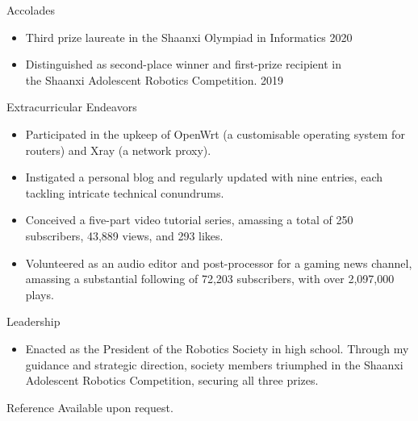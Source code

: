 \documentclass{resume} %
\begin{document}
\begin{rSection}{Accolades} 
\begin{itemize}
    \item Third prize laureate in the Shaanxi Olympiad in Informatics \hfill 2020
    \item Distinguished as second-place winner and first-prize recipient in \\
    the Shaanxi Adolescent Robotics Competition. \hfill 2019
\end{itemize}
\end{rSection}
\begin{rSection}{Extracurricular Endeavors} 
\begin{itemize}
    \item 	Participated in the upkeep of OpenWrt (a customisable operating system for routers) and Xray (a network proxy).
    \item	Instigated a personal blog and regularly updated with nine entries, each tackling intricate technical conundrums.
    \item   Conceived a five-part video tutorial series, amassing a total of 250 subscribers, 43,889 views, and 293 likes.
    \item   Volunteered as an audio editor and post-processor for a gaming news channel, amassing a substantial following of 72,203 subscribers, with over 2,097,000 plays.
\end{itemize}
\end{rSection}

\begin{rSection}{Leadership} 
\begin{itemize}
    \item Enacted as the President of the Robotics Society in high school. 
    Through my guidance and strategic direction, society members triumphed in 
    the Shaanxi Adolescent Robotics Competition, securing all three prizes.
\end{itemize}
\end{rSection}

\begin{rSection}{Reference} 
    Available upon request.
\end{rSection}
\end{document}
